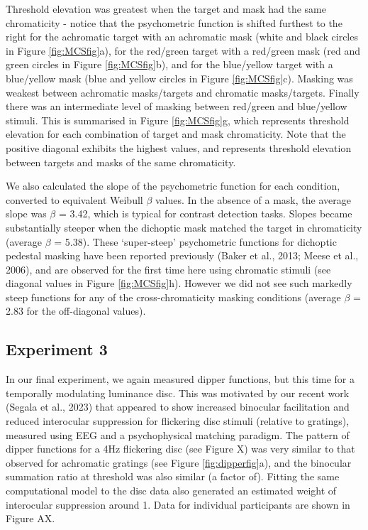 \documentclass[
]{article}
\begin{document}
Threshold elevation was greatest when the target and mask had the same chromaticity - notice that the psychometric function is shifted furthest to the right for the achromatic target with an achromatic mask (white and black circles in Figure \ref{fig:MCSfig}a), for the red/green target with a red/green mask (red and green circles in Figure \ref{fig:MCSfig}b), and for the blue/yellow target with a blue/yellow mask (blue and yellow circles in Figure \ref{fig:MCSfig}c). Masking was weakest between achromatic masks/targets and chromatic masks/targets. Finally there was an intermediate level of masking between red/green and blue/yellow stimuli. This is summarised in Figure \ref{fig:MCSfig}g, which represents threshold elevation for each combination of target and mask chromaticity. Note that the positive diagonal exhibits the highest values, and represents threshold elevation between targets and masks of the same chromaticity.

We also calculated the slope of the psychometric function for each condition, converted to equivalent Weibull \(\beta\) values. In the absence of a mask, the average slope was \(\beta\) = 3.42, which is typical for contrast detection tasks. Slopes became substantially steeper when the dichoptic mask matched the target in chromaticity (average \(\beta\) = 5.38). These `super-steep' psychometric functions for dichoptic pedestal masking have been reported previously (Baker et al., 2013; Meese et al., 2006), and are observed for the first time here using chromatic stimuli (see diagonal values in Figure \ref{fig:MCSfig}h). However we did not see such markedly steep functions for any of the cross-chromaticity masking conditions (average \(\beta\) = 2.83 for the off-diagonal values).

\hypertarget{experiment-3}{%
\subsection{Experiment 3}\label{experiment-3}}

In our final experiment, we again measured dipper functions, but this time for a temporally modulating luminance disc. This was motivated by our recent work (Segala et al., 2023) that appeared to show increased binocular facilitation and reduced interocular suppression for flickering disc stimuli (relative to gratings), measured using EEG and a psychophysical matching paradigm. The pattern of dipper functions for a 4Hz flickering disc (see Figure X) was very similar to that observed for achromatic gratings (see Figure \ref{fig:dipperfig}a), and the binocular summation ratio at threshold was also similar (a factor of). Fitting the same computational model to the disc data also generated an estimated weight of interocular suppression around 1. Data for individual participants are shown in Figure AX.
\end{document}
